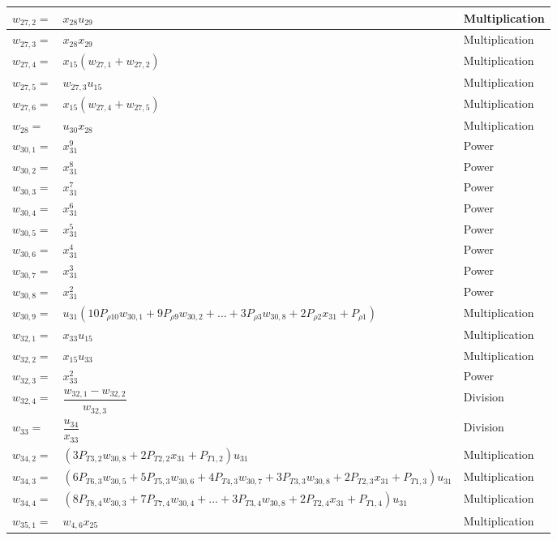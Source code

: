 \begin{longtable}{|p{1.5cm}|l|p{2cm}|}
$w_{27,2}=$ & $ x_{28}u_{29} $ & Multiplication \\ \hline
$w_{27,3}=$ & $ x_{28}x_{29} $ & Multiplication \\ \hline
$w_{27,4}=$ & $ x_{15}\left(w_{27,1}+w_{27,2}\right) $ & Multiplication \\ \hline
$w_{27,5}=$ & $ w_{27,3}u_{15} $ & Multiplication \\ \hline
$w_{27,6}=$ & $ x_{15}\left(w_{27,4}+w_{27,5}\right) $ & Multiplication \\ \hline 
$w_{28}=$ & $ u_{30}x_{28} $ & Multiplication \\ \hline
$w_{30,1}=$ & $ x_{31}^{9} $ & Power \\ \hline
$w_{30,2}=$ & $ x_{31}^{8} $ & Power \\ \hline
$w_{30,3}=$ & $ x_{31}^{7} $ & Power \\ \hline
$w_{30,4}=$ & $ x_{31}^{6} $ & Power \\ \hline
$w_{30,5}=$ & $ x_{31}^{5} $ & Power \\ \hline
$w_{30,6}=$ & $ x_{31}^{4} $ & Power \\ \hline
$w_{30,7}=$ & $ x_{31}^{3} $ & Power \\ \hline
$w_{30,8}=$ & $ x_{31}^{2} $ & Power \\ \hline
$w_{30,9}=$ & $ u_{31}\left(10 P_{\rho 10}w_{30,1}+9 P_{\rho 9}w_{30,2}+\dots+3 P_{\rho 3}w_{30,8}+2 P_{\rho 2}x_{31}+P_{\rho 1}\right) $ & Multiplication \\ \hline
$w_{32,1}=$ & $ x_{33}u_{15} $ & Multiplication \\ \hline
$w_{32,2}=$ & $ x_{15}u_{33} $ & Multiplication \\ \hline
$w_{32,3}=$ & $ x_{33}^{2} $ & Power \\ \hline
$w_{32,4}=$ & $ \dfrac{w_{32,1}-w_{32,2}}{w_{32,3}} $ & Division \\ \hline
$w_{33}=$ & $ \dfrac{u_{34}}{x_{33}} $ & Division \\ \hline
$w_{34,2}=$ & $ \left(3P_{T 3,2}w_{30,8}+2P_{T 2,2}x_{31}+P_{T 1,2}\right)u_{31} $ & Multiplication \\ \hline
$w_{34,3}=$ & $ \left(6 P_{T 6,3}w_{30,5}+5P_{T 5,3}w_{30,6}+4P_{T 4,3}w_{30,7}+3P_{T 3,3}w_{30,8}+2P_{T 2,3}x_{31}+P_{T 1,3}\right)u_{31} $ & Multiplication \\ \hline
$w_{34,4}=$ & $ \left(8 P_{T 8,4}w_{30,3}+7P_{T 7,4}w_{30,4}+\dots+3P_{T 3,4}w_{30,8}+2P_{T 2,4}x_{31}+P_{T 1,4}\right)u_{31} $ & Multiplication \\ \hline
$w_{35,1}=$ & $ w_{4,6}x_{25} $ & Multiplication \\ \hline 

\end{longtable}
